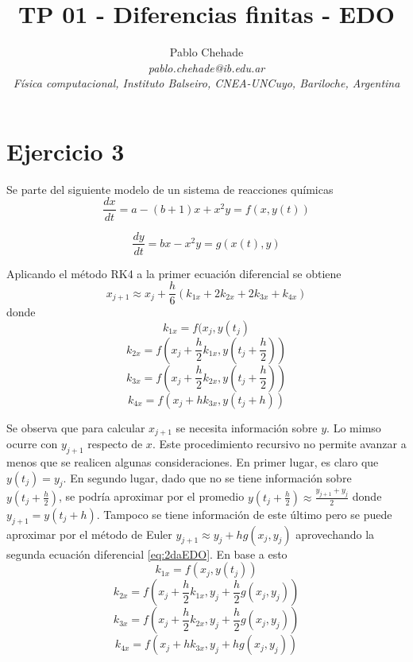 \documentclass[aps,prb,twocolumn,superscriptaddress,floatfix,longbibliography]{revtex4-2}
\newcounter{para}
\begin{document}
\newcommand{\mytitle}{TP 01 - Diferencias finitas - EDO }

\title{\mytitle}

\author{Pablo Chehade \\
    \small \textit{pablo.chehade@ib.edu.ar} \\
    \small \textit{Física computacional, Instituto Balseiro, CNEA-UNCuyo, Bariloche, Argentina} \\}


\maketitle

\section{Ejercicio 3}
Se parte del siguiente modelo de un sistema de reacciones químicas
\begin{equation}
\frac{dx}{dt} = a - (b+1) x + x^2 y = f(x,y(t))
\label{eq:1erEDO}
\end{equation}

\begin{equation}
\frac{dy}{dt} = b x - x^2 y = g(x(t),y)
\label{eq:2daEDO}
\end{equation}

Aplicando el método RK4 a la primer ecuación diferencial se obtiene
\[x_{j+1} \approx x_j + \frac{h}{6} (k_{1x} + 2k_{2x} + 2k_{3x} + k_{4x})\]
donde
\[k_{1x} = f(x_j, y(t_j)\]
\[k_{2x} = f(x_j + \frac{h}{2} k_{1x},y(t_j + \frac{h}{2})) \]
\[k_{3x} = f(x_j + \frac{h}{2} k_{2x},y(t_j + \frac{h}{2}))\]
\[k_{4x} = f(x_j + h k_{3x},y(t_j + h))\]

Se observa que para calcular $x_{j+1}$ se necesita información sobre $y$. Lo mimso ocurre con $y_{j+1}$ respecto de $x$. Este procedimiento recursivo no  permite avanzar a menos que se realicen algunas consideraciones. En primer lugar, es claro que  $y(t_j) = y_j$. En segundo lugar, dado que no se tiene información sobre $y(t_j + \frac{h}{2})$, se podría aproximar por el promedio $y(t_j + \frac{h}{2}) \approx \frac{y_{j+1} + y_j}{2}$ donde $y_{j+1} = y(t_j+h)$. Tampoco se tiene información de este último pero se puede aproximar por el método de Euler $y_{j+1} \approx y_j + h g(x_j,y_j)$ aprovechando la segunda ecuación diferencial \ref{eq:2daEDO}.
En base a esto
\[k_{1x} = f(x_j, y(t_j))\]
\[k_{2x} = f(x_j + \frac{h}{2} k_{1x},y_j + \frac{h}{2} g(x_j,y_j))\]
\[k_{3x} = f(x_j + \frac{h}{2} k_{2x},y_j + \frac{h}{2} g(x_j,y_j))\]
\[k_{4x} = f(x_j + h k_{3x},y_j + h g(x_j,y_j))\]
\end{document}
